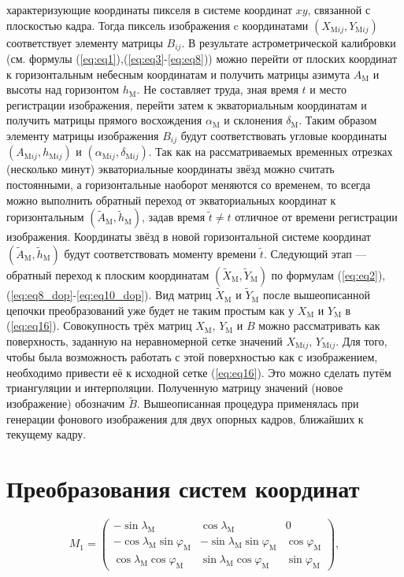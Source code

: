 \documentclass[12pt,a4paper]{article}
\begin{document}
характеризующие координаты пикселя в системе координат $xy$, связанной с плоскостью кадра. Тогда пиксель изображения c координатами  $(X_{\text{M}ij},Y_{\text{M}ij})$ соответствует элементу матрицы $B_{ij}$. В результате астрометрической калибровки (см. формулы (\ref{eq:eq1}),(\ref{eq:eq3}-\ref{eq:eq8})) можно перейти от плоских координат к горизонтальным небесным координатам и получить матрицы азимута $A_{\text{M}}$ и высоты над горизонтом $h_{\text{M}}$. Не составляет труда, зная время $t$ и место регистрации изображения,	перейти затем к экваториальным координатам и получить матрицы прямого восхождения $\alpha_{\text{M}}$ и склонения $\delta_{\text{M}}$. Таким образом элементу матрицы изображения $B_{ij}$ будут соответствовать угловые координаты $(A_{\text{M}ij},h_{\text{M}ij})$ и $(\alpha_{\text{M}ij},\delta_{\text{M}ij})$. Так как на рассматриваемых временных отрезках (несколько минут) экваториальные координаты звёзд можно считать постоянными, а горизонтальные наоборот меняются со временем, то всегда можно выполнить обратный переход от экваториальных координат к горизонтальным $(\tilde{A}_{\text{M}},\tilde{h}_{\text{M}})$, задав время $\tilde{t}\neq t$ отличное от времени регистрации изображения. Координаты звёзд в новой горизонтальной системе координат $(\tilde{A}_{\text{M}},\tilde{h}_{\text{M}})$ будут соответствовать моменту времени $\tilde{t}$. Следующий этап --- обратный переход к плоским координатам $(\tilde{X}_{\text{M}},\tilde{Y}_{\text{M}})$ по формулам (\ref{eq:eq2}),(\ref{eq:eq8_dop}-\ref{eq:eq10_dop}). Вид матриц $\tilde{X}_{\text{M}}$ и $\tilde{Y}_{\text{M}}$ после вышеописанной цепочки преобразований уже будет не таким простым как у $X_{\text{M}}$ и $Y_{\text{M}}$ в (\ref{eq:eq16}). Совокупность трёх матриц $X_{\text{M}}$, $Y_{\text{M}}$ и $B$ можно рассматривать как поверхность, заданную на неравномерной сетке значений $X_{\text{M}ij}$, $Y_{\text{M}ij}$. Для того, чтобы была возможность работать с этой поверхностью как с изображением, необходимо привести её к исходной сетке (\ref{eq:eq16}). Это можно сделать путём триангуляции и интерполяции. Полученную матрицу значений (новое изображение) обозначим $\tilde{B}$. Вышеописанная процедура применялась при генерации фонового изображения для двух опорных кадров, ближайших к текущему кадру. 

\section{Преобразования систем координат} \label{app:modelling1}
\begin{equation}\label{eq:mod6}
M_1=\begin{pmatrix} -\sin{\lambda_\text{M}} & \cos{\lambda_\text{M}} & 0 \\ -\cos{\lambda_\text{M}}\sin{\varphi_\text{M}} & -\sin{\lambda_\text{M}}\sin{\varphi_\text{M}} & \cos{\varphi_\text{M}}\\ \cos{\lambda_\text{M}}\cos{\varphi_\text{M}} & \sin{\lambda_\text{M}}\cos{\varphi_\text{M}} & \sin{\varphi_\text{M}} \end{pmatrix},
\end{equation}
\end{document}
